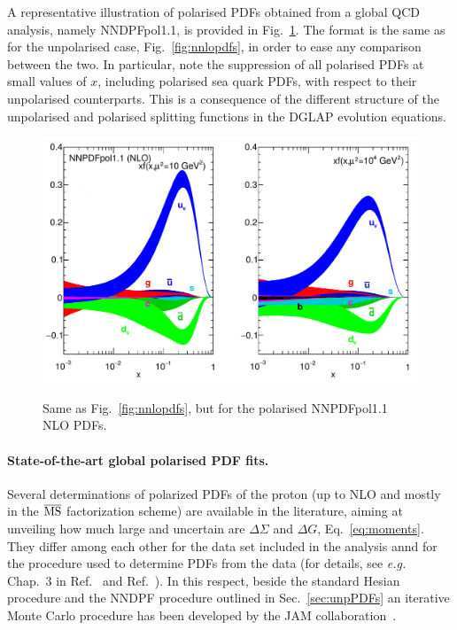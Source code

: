 A representative illustration of polarised PDFs obtained from a global
QCD analysis, namely NNDPFpol1.1, is provided in Fig.~\ref{fig:qPDFpol}.
%
The format is the same as for the unpolarised case, Fig.~\ref{fig:nnlopdfs},
in order to ease any comparison between the two.
%
In particular, note the suppression of all polarised PDFs at small values of 
$x$, including polarised sea quark PDFs, with respect to their unpolarised 
counterparts.
%
This is a consequence of the different structure of the unpolarised and 
polarised splitting functions in the DGLAP evolution equations. 

\begin{figure}[!t]
\centering
\includegraphics[scale=0.4]{plots/NNPDFpol}\\
\caption{\small Same as Fig.~\ref{fig:nnlopdfs}, 
but for the polarised NNPDFpol1.1 NLO PDFs.}
\label{fig:qPDFpol}
\end{figure}


\paragraph{State-of-the-art global polarised PDF fits.}

Several determinations of polarized PDFs of the proton (up to NLO and mostly 
in the $\overline{\rm MS}$ factorization scheme) are available in the 
literature, aiming at unveiling how much large and uncertain are 
$\Delta\Sigma$ and  $\Delta G$, Eq.~\eqref{eq:moments}. 
%
They differ among each other for the data set included in the analysis
annd for the procedure used to determine PDFs from the data (for details, 
see {\it e.g.} Chap.~3 in Ref.~\cite{Nocera:2014vla} 
and Ref.~\cite{Nocera:2016xhb}). 
%
In this respect, beside the standard Hesian procedure and the NNDPF
procedure outlined in Sec.~\ref{sec:unpPDFs}
an iterative Monte Carlo procedure has been developed by the JAM
collaboration~\cite{Sato:2016tuz}.

